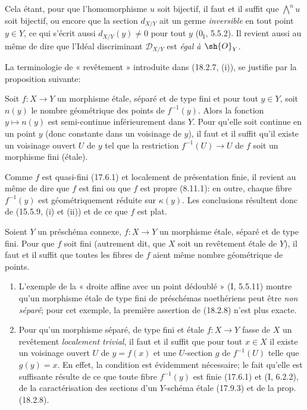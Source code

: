 
Cela étant, pour que l'homomorphisme $u$ soit bijectif, il faut et il suffit que $\bigwedge^n u$ soit bijectif, ou encore que la section $d_{X/Y}$ ait un germe \emph{inversible} en tout point $y\in Y$, ce qui s'écrit aussi $d_{X/Y}(y)\neq 0$ pour tout $y$ ($0_{\mathrm I}$, 5.5.2). Il revient aussi au même de dire que l'Idéal discriminant $\mathscr{D}_{X/Y}$ est \emph{égal à $\sh{O}_Y$}.

La terminologie de « revêtement » introduite dans (18.2.7, (i)), se justifie par la proposition suivante:

\begin{proposition}[18.2.8]
\label{IV.18.2.8}
Soit $f:X\to Y$ un morphisme étale, séparé et de type fini et pour tout $y\in Y$, soit $n(y)$ le nombre géométrique des points de $f^{-1}(y)$. Alors la fonction $y\mapsto n(y)$ est semi-continue inférieurement dans $Y$. Pour qu'elle soit continue en un point $y$ (donc constante dans un voisinage de $y$), il faut et il suffit qu'il existe un voisinage ouvert $U$ de $y$ tel que la restriction $f^{-1}(U)\to U$ de $f$ soit un morphisme fini (étale).
\end{proposition}

Comme $f$ est quasi-fini (17.6.1) et localement de présentation finie, il revient au même de dire que $f$ est fini ou que $f$ est propre (8.11.1): en outre, chaque fibre $f^{-1}(y)$ est géométriquement réduite sur $\kappa(y)$. Les conclusions résultent donc de (15.5.9, (i) et (ii)) et de ce que $f$ est plat.

\begin{corollary}[18.2.9]
\label{IV.18.2.9}
Soient $Y$ un préschéma connexe, $f:X\to Y$ un morphisme étale, séparé et de type fini. Pour que $f$ soit fini (autrement dit, que $X$ soit un revêtement étale de $Y$), il faut et il suffit que toutes les fibres de $f$ aient même nombre géométrique de points.
\end{corollary}

\begin{remarks}[18.2.10]
\label{IV.18.2.10}
\begin{enumerate}
  \item[(i)] L'exemple de la « droite affine avec un point dédoublé » (I, 5.5.11) montre qu'un morphisme étale de type fini de préschémas noethériens peut être \emph{non séparé}; pour cet exemple, la première assertion de (18.2.8) n'est plus exacte.

  \item[(ii)] Pour qu'un morphisme séparé, de type fini et étale $f:X\to Y$ fasse de $X$ un revêtement \emph{localement trivial}, il faut et il suffit que pour tout $x\in X$ il existe un voisinage ouvert $U$ de $y=f(x)$ et une $U$-section $g$ de $f^{-1}(U)$ telle que $g(y)=x$. En effet, la condition est évidemment nécessaire; le fait qu'elle est suffisante résulte de ce que toute fibre $f^{-1}(y)$ est finie (17.6.1) et (I, 6.2.2), de la caractérisation des sections d'un $Y$-schéma étale (17.9.3) et de la prop. (18.2.8).
\end{enumerate}
\end{remarks}

